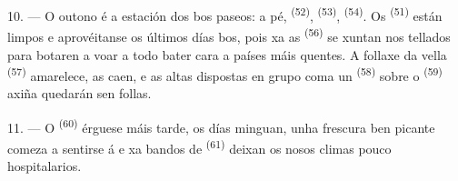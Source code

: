 10. --- O outono é a estación dos bos paseos: a pé,  \textsuperscript{(52)},
 \textsuperscript{(53)},  \textsuperscript{(54)}. Os
 \textsuperscript{(51)} están limpos e aprovéitanse os últimos días bos, pois
xa as  \textsuperscript{(56)} se xuntan nos tellados para botaren a voar a
todo bater cara a países máis quentes. A follaxe da vella 
\textsuperscript{(57)} amarelece, as  caen, e as  altas
dispostas en grupo coma un  \textsuperscript{(58)} sobre o 
\textsuperscript{(59)} axiña quedarán sen follas.

11. --- O  \textsuperscript{(60)} érguese máis tarde, os días minguan, unha
frescura ben picante comeza a sentirse á  e xa bandos de
 \textsuperscript{(61)} deixan os nosos climas pouco hospitalarios.
